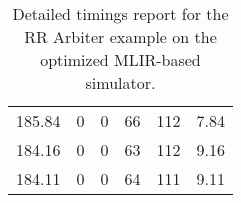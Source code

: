 \begin{table}[h]
{\begin{tabular}{cccccc}
            185.84             & 0                          & 0                          & 66                         & 112                        & 7.84                   \\
            184.16             & 0                          & 0                          & 63                         & 112                        & 9.16                   \\
            184.11             & 0                          & 0                          & 64                         & 111                        & 9.11                   \\
            \bottomrule
        \end{tabular}
    }
    \caption{Detailed timings report for the RR Arbiter example on the optimized MLIR-based simulator.}
\end{table}


